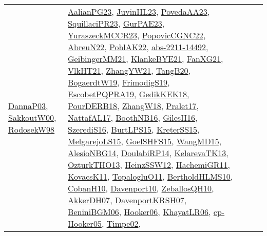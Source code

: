 {\begin{longtable}{llp{6cm}p{6cm}p{6cm}}
\href{papers/DannaP03.pdf}{DannaP03}\cite{DannaP03}, \href{articles/SakkoutW00.pdf}{SakkoutW00}\cite{SakkoutW00}, \href{papers/RodosekW98.pdf}{RodosekW98}\cite{RodosekW98} & \href{papers/AalianPG23.pdf}{AalianPG23}\cite{AalianPG23}, \href{papers/JuvinHL23.pdf}{JuvinHL23}\cite{JuvinHL23}, \href{papers/PovedaAA23.pdf}{PovedaAA23}\cite{PovedaAA23}, \href{papers/SquillaciPR23.pdf}{SquillaciPR23}\cite{SquillaciPR23}, \href{articles/GurPAE23.pdf}{GurPAE23}\cite{GurPAE23}, \href{articles/YuraszeckMCCR23.pdf}{YuraszeckMCCR23}\cite{YuraszeckMCCR23}, \href{papers/PopovicCGNC22.pdf}{PopovicCGNC22}\cite{PopovicCGNC22}, \href{articles/AbreuN22.pdf}{AbreuN22}\cite{AbreuN22}, \href{articles/PohlAK22.pdf}{PohlAK22}\cite{PohlAK22}, \href{articles/abs-2211-14492.pdf}{abs-2211-14492}\cite{abs-2211-14492}, \href{papers/GeibingerMM21.pdf}{GeibingerMM21}\cite{GeibingerMM21}, \href{papers/KlankeBYE21.pdf}{KlankeBYE21}\cite{KlankeBYE21}, \href{articles/FanXG21.pdf}{FanXG21}\cite{FanXG21}, \href{articles/VlkHT21.pdf}{VlkHT21}\cite{VlkHT21}, \href{articles/ZhangYW21.pdf}{ZhangYW21}\cite{ZhangYW21}, \href{papers/TangB20.pdf}{TangB20}\cite{TangB20}, \href{papers/BogaerdtW19.pdf}{BogaerdtW19}\cite{BogaerdtW19}, \href{papers/FrimodigS19.pdf}{FrimodigS19}\cite{FrimodigS19}, \href{articles/EscobetPQPRA19.pdf}{EscobetPQPRA19}\cite{EscobetPQPRA19}, \href{articles/GedikKEK18.pdf}{GedikKEK18}\cite{GedikKEK18}, \href{articles/PourDERB18.pdf}{PourDERB18}\cite{PourDERB18}, \href{articles/ZhangW18.pdf}{ZhangW18}\cite{ZhangW18}, \href{papers/Pralet17.pdf}{Pralet17}\cite{Pralet17}, \href{articles/NattafAL17.pdf}{NattafAL17}\cite{NattafAL17}, \href{papers/BoothNB16.pdf}{BoothNB16}\cite{BoothNB16}, \href{papers/GilesH16.pdf}{GilesH16}\cite{GilesH16}, \href{papers/SzerediS16.pdf}{SzerediS16}\cite{SzerediS16}, \href{papers/BurtLPS15.pdf}{BurtLPS15}\cite{BurtLPS15}, \href{papers/KreterSS15.pdf}{KreterSS15}\cite{KreterSS15}, \href{papers/MelgarejoLS15.pdf}{MelgarejoLS15}\cite{MelgarejoLS15}, \href{articles/GoelSHFS15.pdf}{GoelSHFS15}\cite{GoelSHFS15}, \href{articles/WangMD15.pdf}{WangMD15}\cite{WangMD15}, \href{papers/AlesioNBG14.pdf}{AlesioNBG14}\cite{AlesioNBG14}, \href{papers/DoulabiRP14.pdf}{DoulabiRP14}\cite{DoulabiRP14}, \href{papers/KelarevaTK13.pdf}{KelarevaTK13}\cite{KelarevaTK13}, \href{articles/OzturkTHO13.pdf}{OzturkTHO13}\cite{OzturkTHO13}, \href{articles/HeinzSSW12.pdf}{HeinzSSW12}\cite{HeinzSSW12}, \href{articles/HachemiGR11.pdf}{HachemiGR11}\cite{HachemiGR11}, \href{articles/KovacsK11.pdf}{KovacsK11}\cite{KovacsK11}, \href{articles/TopalogluO11.pdf}{TopalogluO11}\cite{TopalogluO11}, \href{papers/BertholdHLMS10.pdf}{BertholdHLMS10}\cite{BertholdHLMS10}, \href{papers/CobanH10.pdf}{CobanH10}\cite{CobanH10}, \href{papers/Davenport10.pdf}{Davenport10}\cite{Davenport10}, \href{articles/ZeballosQH10.pdf}{ZeballosQH10}\cite{ZeballosQH10}, \href{papers/AkkerDH07.pdf}{AkkerDH07}\cite{AkkerDH07}, \href{papers/DavenportKRSH07.pdf}{DavenportKRSH07}\cite{DavenportKRSH07}, \href{papers/BeniniBGM06.pdf}{BeniniBGM06}\cite{BeniniBGM06}, \href{articles/Hooker06.pdf}{Hooker06}\cite{Hooker06}, \href{articles/KhayatLR06.pdf}{KhayatLR06}\cite{KhayatLR06}, \href{papers/cp-Hooker05.pdf}{cp-Hooker05}\cite{cp-Hooker05}, \href{articles/Timpe02.pdf}{Timpe02}\cite{Timpe02}, 
\end{longtable}}
